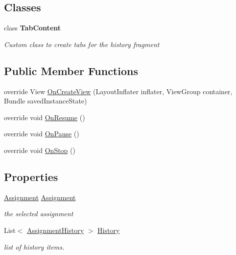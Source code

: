 \subsection*{Classes}
\begin{DoxyCompactItemize}
\item 
class {\bfseries Tab\+Content}
\begin{DoxyCompactList}\small\item\em Custom class to create tabs for the history fragment \end{DoxyCompactList}\end{DoxyCompactItemize}
\subsection*{Public Member Functions}
\begin{DoxyCompactItemize}
\item 
override View \hyperlink{class_field_service_1_1_android_1_1_fragments_1_1_history_fragment_ac389d6c04e678d6d70b35dced1ead765}{On\+Create\+View} (Layout\+Inflater inflater, View\+Group container, Bundle saved\+Instance\+State)
\item 
override void \hyperlink{class_field_service_1_1_android_1_1_fragments_1_1_history_fragment_a10db93019cb83ea44d9f93aebe4501ed}{On\+Resume} ()
\item 
override void \hyperlink{class_field_service_1_1_android_1_1_fragments_1_1_history_fragment_a5d2ff2060fa7b79d66ab458b4e02c4b1}{On\+Pause} ()
\item 
override void \hyperlink{class_field_service_1_1_android_1_1_fragments_1_1_history_fragment_a93bc3eea5eb28dcf0dc2f6a0f9491258}{On\+Stop} ()
\end{DoxyCompactItemize}
\subsection*{Properties}
\begin{DoxyCompactItemize}
\item 
\hyperlink{class_field_service_1_1_data_1_1_assignment}{Assignment} \hyperlink{class_field_service_1_1_android_1_1_fragments_1_1_history_fragment_a23e1fc62664111f36369e391b7c734d2}{Assignment}
\begin{DoxyCompactList}\small\item\em the selected assignment \end{DoxyCompactList}\item 
List$<$ \hyperlink{class_field_service_1_1_data_1_1_assignment_history}{Assignment\+History} $>$ \hyperlink{class_field_service_1_1_android_1_1_fragments_1_1_history_fragment_af376472c171eab56ce98e2eec5b68bb5}{History}
\begin{DoxyCompactList}\small\item\em list of history items. \end{DoxyCompactList}\end{DoxyCompactItemize}


